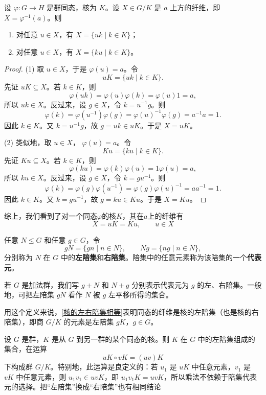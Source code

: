 \begin{proposition}\label{核的左右陪集相等}
	设 $\varphi:G\to H$ 是群同态，核为 $K$。设 $X\in G/K$ 是 $a$ 上方的纤维，即 $X=\varphi^{-1}(a)$。则
\begin{enumerate}[label=(\arabic*)]
	\item 对任意 $u\in X$，有 $X=\{uk\mid k\in K\}$；
	\item 对任意 $u\in X$，有 $X=\{ku\mid k\in K\}$。
\end{enumerate}
\end{proposition}
\begin{proof}
	(1) 取 $u\in X$，于是 $\varphi(u)=a$。令
	\[
	uK=\{uk\mid k\in K\}.
	\]
	先证 $uK\subseteq X$。若 $k\in K$，则
	\[
	\varphi(uk)=\varphi(u)\varphi(k)=\varphi(u)1=a,
	\]
	所以 $uk\in X$。反过来，设 $g\in X$，令 $k=u^{-1}g$。则
	\[
	\varphi(k)=\varphi(u^{-1})\varphi(g)=\varphi(u)^{-1}\varphi(g)=a^{-1}a=1.
	\]
	因此 $k\in K$。又 $k=u^{-1}g$，故 $g=uk\in uK$。于是 $X=uK$。
	
	(2) 类似地，取 $u\in X$， $\varphi(u)=a$。令
	\[
	Ku=\{ku\mid k\in K\}.
	\]
	先证 $Ku\subseteq X$。若 $k\in K$，则
	\[
	\varphi(ku)=\varphi(k)\varphi(u)=1\varphi(u)=a,
	\]
	所以 $ku\in X$。反过来，设 $g\in X$，令 $k=gu^{-1}$。则
	\[
	\varphi(k)=\varphi(g)\varphi(u^{-1})=\varphi(g)\varphi(u)^{-1}=aa^{-1}=1.
	\]
	因此 $k\in K$。又 $k=gu^{-1}$，故 $g=ku\in Ku$。于是 $X=Ku$。
\end{proof}
综上，我们看到了对一个同态$\varphi $的核$K$，其在$a$上的纤维有
\[X = uK = Ku,\qquad u\in X\]

\begin{definition}
	任意 $N\leq G$ 和任意 $g\in G$，令
\[
gN=\{gn\mid n\in N\},\qquad Ng=\{ng\mid n\in N\},
\]
分别称为 $N$ 在 $G$ 中的\textbf{左陪集}和\textbf{右陪集}。陪集中的任意元素称为该陪集的一个\textbf{代表元}。

\end{definition}
若 $G$ 是加法群，我们写 $g+N$ 和 $N+g$ 分别表示代表元为 $g$ 的左、右陪集。一般地，可把左陪集 $gN$ 看作 $N$ 被 $g$ 左平移所得的集合。


用这个定义来说，\ref{核的左右陪集相等}表明同态的纤维是核的左陪集（也是核的右陪集），即商 $G/K$ 的元素是左陪集 $gK$，$g\in G$。



\begin{proposition}\label{陪集的乘积是良定的}
	设 $G$ 是群，$K$ 是从 $G$ 到另一群的某个同态的核。则 $K$ 在 $G$ 中的左陪集组成的集合，在运算
\[
uK\circ vK=(uv)K
\]
下构成群 $G/K$。特别地，此运算是良定义的：若 $u_1$ 是 $uK$ 中任意元素，$v_1$ 是 $vK$ 中任意元素，则 $u_1v_1\in uvK$，即 $u_1v_1K=uvK$，所以乘法不依赖于陪集代表元的选择。把“左陪集”换成“右陪集”也有相同结论
\end{proposition}

